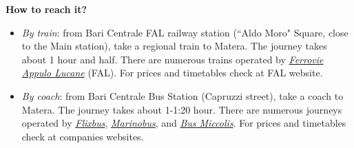 \documentclass[
	openany, %
	parskip=full, %
	12pt, %
	a4paper, %
]{conferencebooklet} %
\newcommand\smallbull{\scaleobj{0.7}{\blacksquare}}
\newcommand\itema{\item[\textcolor{case_blue}{$\smallbull$}]}
\begin{document}
\newpage
\begin{adjustwidth}{8pt}{12pt}
\begin{table}[h!]
\end{table}
\vspace{-3mm}
\textbf{How to reach it?}
\vspace{-5mm}
\begin{itemize}[leftmargin=*, noitemsep]
        \itema \textit{By train}: from Bari Centrale FAL railway station (``Aldo Moro" Square, close to the Main station), take a regional train to Matera. The journey takes about 1 hour and half. There are numerous trains operated by \color{blue}\href{https://ferrovieappulolucane.it/en/}{\textit{Ferrovie Appulo Lucane}} \color{black} (FAL). For prices and timetables check at FAL website.
        \itema  \textit{By coach}: from Bari Centrale Bus Station (Capruzzi street), take a coach to Matera. The journey takes about 1-1:20 hour. There are numerous journeys operated by \color{blue}\href{https://www.flixbus.com/?noRedirect=true}{\textit{Flixbus}}\color{black}, \color{blue}\href{https://marinobus.it/en/}{\textit{Marinobus}}\color{black}, and \color{blue}\href{https://www.busmiccolis.it/en/linee-extraurbane/}{\textit{Bus Miccolis}}\color{black}. For prices and timetables check at companies websites.
    \end{itemize}


\end{adjustwidth}
\end{document}
